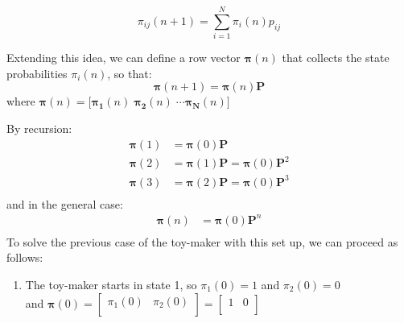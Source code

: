 \documentclass[../main.tex]{subfiles}
\begin{document}
\begin{small}
\begin{equation}
    \pi_{ij}(n+1) = \sum_{i=1}^{N}\pi_i(n) p_{ij}
\end{equation}

\noindent Extending this idea, we can define a row vector $\bm{\pi}(n)$ that collects the state probabilities $\pi_i(n)$, so that:
\begin{equation}
   \bm{\pi }(n+1)= \bm{\pi}(n) \mathbf{P}
\end{equation}
where $\bm{\pi}(n) = \lbrack \bm{\pi_1}(n) \; \bm{\pi_2}(n) \; \cdots \bm{\pi_N}(n) \rbrack$ 

\noindent By recursion:
\begin{equation}
\begin{split}
   \bm{\pi}(1)&= \bm{\pi}(0) \bm{P} \\ 
   \bm{\pi }(2)&= \bm{\pi}(1) \bm{P} = \bm{\pi}(0) \bm{P}^2 \\ 
   \bm{\pi }(3)&= \bm{\pi}(2) \bm{P} = \bm{\pi}(0) \mathbf{P}^3\\
\end{split}
\end{equation}
and in the general case:
\begin{equation}
\begin{split}
   \bm{\pi}(n)&= \bm{\pi}(0) \mathbf{P}^n \\ 
\end{split}
\end{equation}
To solve the previous case of the toy-maker with this set up, we can proceed as follows:
\begin{enumerate}
    \item The toy-maker starts in state 1, so $\pi_1(0) = 1$ and $\pi_2(0) = 0$\\
    and $\bm{\pi}(0) = \begin{bmatrix}
    \pi_1(0) & \pi_2(0)\\
  \end{bmatrix}
 = \begin{bmatrix}
    1 & 0\\
  \end{bmatrix}$


\end{enumerate}
\end{small}
\end{document}
